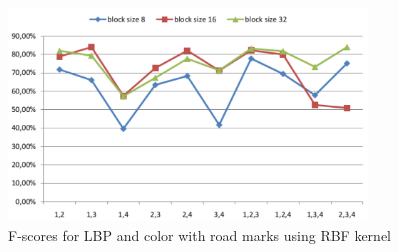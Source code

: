 \documentclass[runningheads,a4paper]{llncs}
\begin{document}
\begin{figure}
\centering
\includegraphics[width=0.85\textwidth]{fig/RBF-LBP-COL-wi-RM.pdf}
\caption{F-scores for LBP and color with road marks using RBF kernel}
\end{figure}
\end{document}
